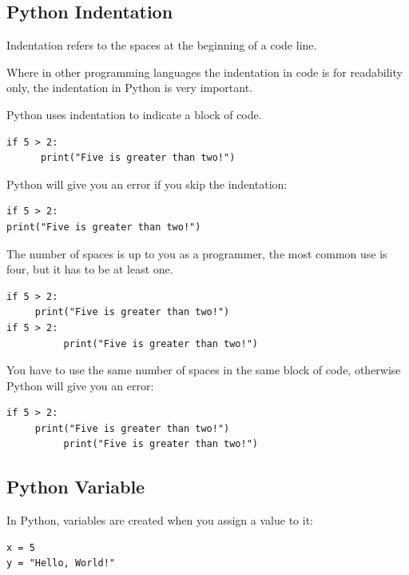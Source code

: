 \documentclass[12pt,a4paper]{article}
\begin{document}
\subsection{Python Indentation}
Indentation refers to the spaces at the beginning of a code line.

Where in other programming languages the indentation in code is for readability
only, the indentation in Python is very important.

Python uses indentation to indicate a block of code.

\begin{ebox}
\begin{lstlisting}
if 5 > 2:
      print("Five is greater than two!")
\end{lstlisting}
\end{ebox}

Python will give you an error if you skip the indentation:

\begin{abox}
\begin{lstlisting}
if 5 > 2:
print("Five is greater than two!")
\end{lstlisting}
\end{abox}

The number of spaces is up to you as a programmer, the most common use is four,
but it has to be at least one.

\begin{ebox}
\begin{lstlisting}
if 5 > 2:
     print("Five is greater than two!")
if 5 > 2:
          print("Five is greater than two!")
\end{lstlisting}
\end{ebox}

You have to use the same number of spaces in the same block of code, otherwise
Python will give you an error:

\begin{abox}
\begin{lstlisting}
if 5 > 2:
     print("Five is greater than two!")
          print("Five is greater than two!")
\end{lstlisting}
\end{abox}
\subsection{Python Variable}
In Python, variables are created when you assign a value to it:

\begin{ebox}
\begin{lstlisting}
x = 5
y = "Hello, World!"
\end{lstlisting}
\end{ebox}
\end{document}
